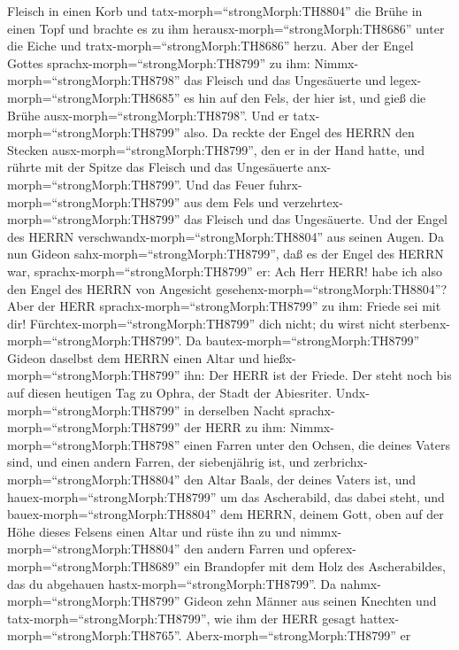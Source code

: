 Fleisch in einen Korb und tatx-morph=``strongMorph:TH8804'' die Brühe in
einen Topf und brachte es zu ihm herausx-morph=``strongMorph:TH8686''
unter die Eiche und tratx-morph=``strongMorph:TH8686'' herzu.
 Aber der Engel Gottes sprachx-morph=``strongMorph:TH8799''
zu ihm: Nimmx-morph=``strongMorph:TH8798'' das Fleisch und das
Ungesäuerte und legex-morph=``strongMorph:TH8685'' es hin auf den Fels,
der hier ist, und gieß die Brühe ausx-morph=``strongMorph:TH8798''. Und
er tatx-morph=``strongMorph:TH8799'' also.  Da reckte der
Engel des HERRN den Stecken ausx-morph=``strongMorph:TH8799'', den er in
der Hand hatte, und rührte mit der Spitze das Fleisch und das
Ungesäuerte anx-morph=``strongMorph:TH8799''. Und das Feuer
fuhrx-morph=``strongMorph:TH8799'' aus dem Fels und
verzehrtex-morph=``strongMorph:TH8799'' das Fleisch und das Ungesäuerte.
Und der Engel des HERRN verschwandx-morph=``strongMorph:TH8804'' aus
seinen Augen.  Da nun Gideon
sahx-morph=``strongMorph:TH8799'', daß es der Engel des HERRN war,
sprachx-morph=``strongMorph:TH8799'' er: Ach Herr HERR! habe ich also
den Engel des HERRN von Angesicht gesehenx-morph=``strongMorph:TH8804''?
 Aber der HERR sprachx-morph=``strongMorph:TH8799'' zu ihm:
Friede sei mit dir! Fürchtex-morph=``strongMorph:TH8799'' dich nicht; du
wirst nicht sterbenx-morph=``strongMorph:TH8799''.  Da
bautex-morph=``strongMorph:TH8799'' Gideon daselbst dem HERRN einen
Altar und hießx-morph=``strongMorph:TH8799'' ihn: Der HERR ist der
Friede. Der steht noch bis auf diesen heutigen Tag zu Ophra, der Stadt
der Abiesriter.  Undx-morph=``strongMorph:TH8799'' in
derselben Nacht sprachx-morph=``strongMorph:TH8799'' der HERR zu ihm:
Nimmx-morph=``strongMorph:TH8798'' einen Farren unter den Ochsen, die
deines Vaters sind, und einen andern Farren, der siebenjährig ist, und
zerbrichx-morph=``strongMorph:TH8804'' den Altar Baals, der deines
Vaters ist, und hauex-morph=``strongMorph:TH8799'' um das Ascherabild,
das dabei steht,  und bauex-morph=``strongMorph:TH8804''
dem HERRN, deinem Gott, oben auf der Höhe dieses Felsens einen Altar und
rüste ihn zu und nimmx-morph=``strongMorph:TH8804'' den andern Farren
und opferex-morph=``strongMorph:TH8689'' ein Brandopfer mit dem Holz des
Ascherabildes, das du abgehauen hastx-morph=``strongMorph:TH8799''.
 Da nahmx-morph=``strongMorph:TH8799'' Gideon zehn Männer
aus seinen Knechten und tatx-morph=``strongMorph:TH8799'', wie ihm der
HERR gesagt hattex-morph=``strongMorph:TH8765''.
Aberx-morph=``strongMorph:TH8799'' er
